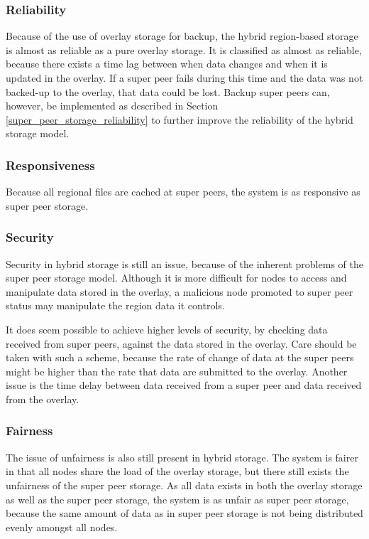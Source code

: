 \documentclass[10pt,a4paper,journal,cspaper,compsoc]{IEEEtran}
\begin{document}
\subsubsection{Reliability}
\label{hybrid_storage_reliability}

Because of the use of overlay storage for backup, the hybrid region-based storage is almost as reliable as a pure overlay storage. It is classified
as almost as reliable, because there exists a time lag between when data changes and when it is updated in the overlay. If a super peer fails during
this time and the data was not backed-up to the overlay, that data could be lost. Backup super peers can, however, be implemented as described in
Section \ref{super_peer_storage_reliability} to further improve the reliability of the hybrid storage model.

\subsubsection{Responsiveness}

Because all regional files are cached at super peers, the system is as responsive as super peer storage.

\subsubsection{Security}

Security in hybrid storage is still an issue, because of the inherent problems of the super peer storage model. Although it is more difficult for
nodes to access and manipulate data stored in the overlay, a malicious node promoted to super peer status may manipulate the region data it controls.

It does seem possible to achieve higher levels of security, by checking data received from super peers, against the data stored in the overlay. Care
should be taken with such a scheme, because the rate of change of data at the super peers might be higher than the rate that data are submitted to
the overlay. Another issue is the time delay between data received from a super peer and data received from the overlay.

\subsubsection{Fairness}

The issue of unfairness is also still present in hybrid storage. The system is fairer in that all nodes share the load of the overlay storage, but
there still exists the unfairness of the super peer storage. As all data exists in both the overlay storage as well as the super peer storage, the
system is as unfair as super peer storage, because the same amount of data as in super peer storage is not being distributed evenly amongst all
nodes.
\end{document}
